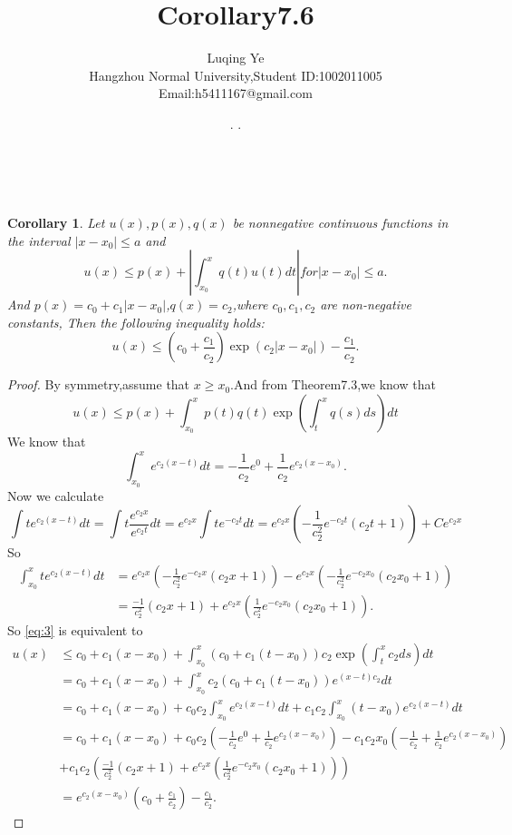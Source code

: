 \documentclass[a4paper, 12pt]{article} %
\makeatletter
\newtheorem*{pdtheorem}{Corollary}
\newenvironment{corollary}
{\bigskip\begin{mdframed}[backgroundcolor=gray!40,rightline=false,leftline=false,topline=false,bottomline=false]\begin{pdtheorem}}
    {\end{pdtheorem}\end{mdframed}\bigskip}
\renewcommand{\maketitle}{ %
  \newcommand{\D}{\displaystyle}\newcommand{\ri}{\Rightarrow}
  \newcommand{\ds}{\displaystyle} \renewcommand{\ni}{\noindent}
  \newcommand{\pa}{\partial} \newcommand{\Om}{\Omega}
  \newcommand{\om}{\omega} \newcommand{\sik}{\sum_{i=1}^k}
  \newcommand{\vov}{\Vert\omega\Vert} \newcommand{\Umy}{U_{\mu_i,y^i}}
  \newcommand{\lamns}{\lambda_n^{^{\scriptstyle\sigma}}}
  \newcommand{\chiomn}{\chi_{_{\Omega_n}}}
  \newcommand{\ullim}{\underline{\lim}} \newcommand{\bsy}{\boldsymbol}
  \newcommand{\mvb}{\mathversion{bold}} \newcommand{\la}{\lambda}
  \newcommand{\La}{\Lambda} \newcommand{\va}{\varepsilon}
  \newcommand{\be}{\beta} \newcommand{\al}{\alpha}
  \newcommand{\dis}{\displaystyle} \newcommand{\R}{{\mathbb R}}
  \newcommand{\N}{{\mathbb N}} \newcommand{\cF}{{\mathcal F}}
  \newcommand{\gB}{{\mathfrak B}} \newcommand{\eps}{\epsilon}
  \begin{flushright} %
    {\LARGE\@title} %
    
    \vspace{50pt} %
    
    {\large\@author} %
    \\\@date %
    
    \vspace{40pt} %
  \end{flushright}
}
\makeatother
\begin{document}
\begin{CJK}{UTF8}{gkai}
  \title{\textbf{Corollary7.6}}
  \author{\small{Luqing Ye}\\{\small{Hangzhou Normal
        University,Student
        ID:1002011005}}\\{\small{Email:h5411167@gmail.com}}} %
  \renewcommand{\today}{\number\year. \number\month. \number\day}
  \date{\today} %
  
  
  
  \maketitle
  \begin{corollary}
    Let $u(x),p(x),q(x)$ be nonnegative continuous functions in the
    interval $|x-x_0|\leq a$ and
    \begin{equation}
      \label{eq:1}
      u(x)\leq p(x)+\left|\int_{x_0}^xq(t)u(t)dt\right| for |x-x_0|\leq a.
    \end{equation}
    And $p(x)=c_0+c_1|x-x_0|$,$q(x)=c_2$,where $c_0,c_1,c_2$ are
    non-negative constants, Then the following inequality holds:
    \begin{equation}
      \label{eq:2}
      u(x)\leq \left(c_0+\frac{c_1}{c_2}\right)\exp(c_2|x-x_0|)-\frac{c_1}{c_2}.
    \end{equation}
  \end{corollary}
  \begin{proof}
By symmetry,assume that $x\geq x_0$.And from Theorem7.3,we know that
    \begin{equation}
      \label{eq:3}
      u(x)\leq p(x)+\int_{x_0}^xp(t)q(t)\exp\left(\int_t^xq(s)ds\right)dt
    \end{equation}
We know that
$$
\int_{x_0}^xe^{c_2(x-t)}dt=-\frac{1}{c_2}e^{0}+\frac{1}{c_2}e^{c_2(x-x_{0})}.
$$
Now we calculate 
$$
\int te^{c_2(x-t)}dt=\int t\frac{e^{c_2x}}{e^{c_2t}}dt=e^{c_{2}x}\int
te^{-c_2t}dt=e^{c_2x}(-\frac{1}{c_{2}^{2}}e^{-c_{2}t}(c_{2}t+1))+Ce^{c_2x}
$$
So
\begin{align*}
  \int_{x_0}^xte^{c_2(x-t)}dt&=e^{c_2x}(-\frac{1}{c_2^2}e^{-c_{2}x}(c_2x+1))-e^{c_2x}(-\frac{1}{c_2^2}e^{-c_2x_0}(c_2x_0+1))\\&=\frac{-1}{c_2^2}(c_2x+1)+e^{c_2x}(\frac{1}{c_2^2}e^{-c_2x_0}(c_2x_0+1)).
\end{align*}
So \eqref{eq:3} is equivalent to
\begin{align*}
  u(x)&\leq c_0+c_1(x-x_0)+\int_{x_0}^x(c_0+c_1(t-x_0))c_2\exp\left(\int_t^{x}c_{2}ds\right)dt\\&=c_0+c_1(x-x_0)+\int_{x_0}^xc_2(c_0+c_1(t-x_0))e^{(x-t)c_2}dt\\&=c_0+c_1(x-x_0)+c_0c_{2}\int_{x_0}^xe^{c_2(x-t)}dt+c_1c_2\int_{x_0}^x(t-x_0)e^{c_2(x-t)}dt\\&=c_0+c_1(x-x_{0})+c_{0}c_{2}(-\frac{1}{c_2}e^0+\frac{1}{c_2}e^{c_2(x-x_{0})})-c_1c_2x_0(-\frac{1}{c_2}+\frac{1}{c_2}e^{c_2(x-x_{0})})\\&+c_1c_2(\frac{-1}{c_2^2}(c_2x+1)+e^{c_2x}(\frac{1}{c_2^2}e^{-c_2x_0}(c_2x_0+1)))\\&=e^{c_2(x-x_0)}(c_0+\frac{c_1}{c_2})-\frac{c_1}{c_2}.

\end{align*}
\end{proof}
\end{CJK}
\end{document}
